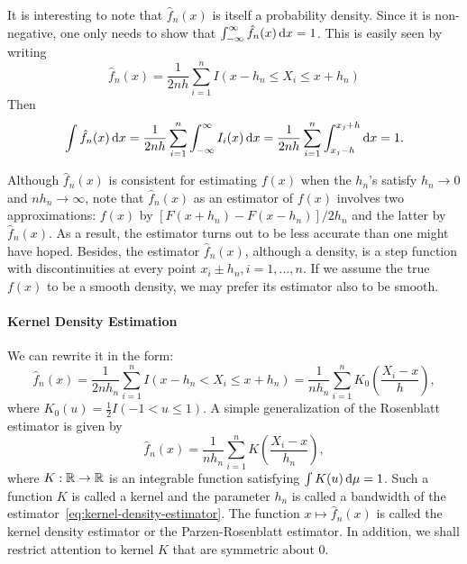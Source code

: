 It is interesting to note that \(\hat{f}_{n}(x)\) is itself a probability density. Since it is non-negative, one only needs to show that \(\int_{-\infty}^{\infty}\hat{f}_{n}(x)\mathop{}\!\mathrm{d} x=1\). This is easily seen by writing
\begin{equation*}
	\hat{f}_{n}(x)=\frac{1}{2nh}\sum_{i=1}^{n}I(x-h_{n}\leq X_{i}\leq x+h_{n})
\end{equation*}
Then
\begin{equation*}
	\int\hat{f}_{n}(x)\mathop{}\!\mathrm{d} x=\frac{1}{2nh}\sum_{i=1}^{n}\int_{-\infty}^{\infty}I_i(x)\mathop{}\!\mathrm{d} x=\frac{1}{2nh}\sum_{i=1}^{n}\int_{x_j-h}^{x_j+h}\mathop{}\!\mathrm{d} x=1.
\end{equation*}

\begin{remark}
	Although \(\hat{f}_{n}(x)\) is consistent for estimating \(f(x)\) when the \(h_{n}\)'s satisfy \(h_{n}\rightarrow0\) and \(nh_{n}\rightarrow\infty\), note that \(\hat{f}_{n}(x)\) as an estimator of \(f(x)\) involves two approximations: \(f(x)\) by \([F(x+h_{n})-F(x-h_{n})]/2h_{n}\) and the latter by \(\hat{f}_{n}(x)\). As a result, the estimator turns out to be less accurate than one might have hoped.
	Besides, the estimator \(\hat{f}_{n}(x)\), although a density, is a step function with discontinuities at every point \(x_{i}\pm h_{n},i=1,\ldots,n\). If we assume the true \(f(x)\) to be a smooth density, we may prefer its estimator also to be smooth.
\end{remark}

\paragraph{Kernel Density Estimation}

We can rewrite it in the form:
\begin{equation*}
	\hat{f}_{n}(x)=\frac{1}{2nh_{n}}\sum_{i=1}^{n}I\left(x-h_{n}<X_{i}\leq x+h_{n}\right)=\frac{1}{nh_{n}}\sum_{i=1}^{n}K_{0}\left(\frac{X_i-x}{h}\right),
\end{equation*}
where \(K_0(u)=\frac{1}{2}I(-1<u\leq 1)\). A simple generalization of the Rosenblatt estimator is given by
\begin{equation}
	\label{eq:kernel-density-estimator}
	\hat{f}_{n}(x)=\frac{1}{nh_{n}}\sum_{i=1}^{n}K\left(\frac{X_{i}-x}{h_{n}}\right),
\end{equation}
where \(K:\mathbb{R}\rightarrow\mathbb{R}\) is an integrable function satisfying \(\int K(u)\mathop{}\!\mathrm{d}\mu=1\).
Such a function \(K\) is called a kernel and the parameter \(h_{n}\) is called a bandwidth of the estimator~\eqref{eq:kernel-density-estimator}.
The function \(x\mapsto\hat{f}_{n}(x)\) is called the kernel density estimator or the Parzen-Rosenblatt estimator.
In addition, we shall restrict attention to kernel \(K\) that are symmetric about \(0\).


